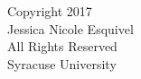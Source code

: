 \vspace*{5cm}
\begin{center}
    Copyright 2017\\
    Jessica Nicole Esquivel\\
    All Rights Reserved\\
    Syracuse University\\
\end{center}
\setcounter{page}{3}
\thispagestyle{empty}

\clearpage

